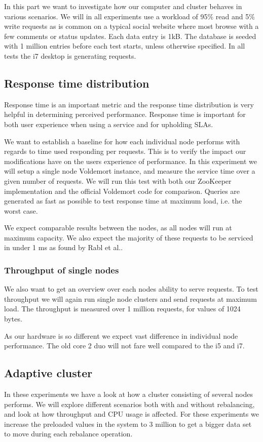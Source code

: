 In this part we want to investigate how our computer and cluster behaves in various scenarios. We will in all experiments use a workload of 95\% read and 5\% write requests as is common on a typical social website where most browse with a few comments or status updates. Each data entry is 1kB. The database is seeded with 1 million entries before each test starts, unless otherwise specified. In all tests the i7 desktop is generating requests. 

\subsection{Response time distribution}
Response time is an important metric and the response time distribution is very helpful in determining perceived performance. Response time is important for both user experience when using a service and for upholding SLAs.

We want to establish a baseline for how each individual node performs with regards to time used responding per requests. This is to verify the impact our modifications have on the users experience of performance. In this experiment we will setup a single node Voldemort instance, and measure the service time over a given number of requests. We will run this test with both our ZooKeeper implementation and the official Voldemort code for comparison. 
Queries are generated as fast as possible to test response time at maximum load, i.e. the worst case.

We expect comparable results between the nodes, as all nodes will run at maximum capacity. We also expect the majority of these requests to be serviced in under 1 ms as found by Rabl et al.\cite{Rabl:2012:SBD:2367502.2367512}.

\subsubsection{Throughput of single nodes}
We also want to get an overview over each nodes ability to serve requests. To test throughput we will again run single node clusters and send requests at maximum load. The throughput is measured over 1 million requests, for values of 1024 bytes. 

As our hardware is so different we expect vast difference in individual node performance. The old core 2 duo will not fare well compared to the i5 and i7. 

\subsection{Adaptive cluster}
In these experiments we have a look at how a cluster consisting of several nodes performs. We will explore different scenarios both with and without rebalancing, and look at how throughput and CPU usage is affected. For these experiments we increase the preloaded values in the system to 3 million to get a bigger data set to move during each rebalance operation. 

